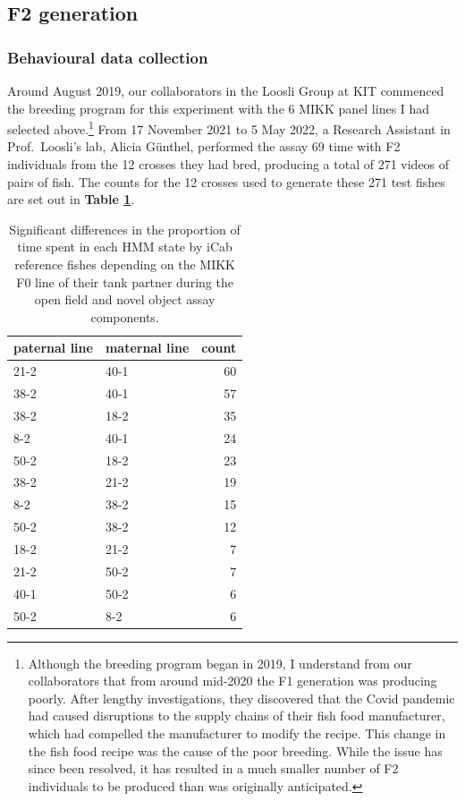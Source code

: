 \documentclass[
]{article}
\begin{document}
\hypertarget{f2-generation}{%
\subsection{F2 generation}\label{f2-generation}}

\hypertarget{behavioural-data-collection}{%
\subsubsection{Behavioural data collection}\label{behavioural-data-collection}}

Around August 2019, our collaborators in the Loosli Group at KIT commenced the breeding program for this experiment with the 6 MIKK panel lines I had selected above.\footnote{Although the breeding program began in 2019, I understand from our collaborators that from around mid-2020 the F1 generation was producing poorly. After lengthy investigations, they discovered that the Covid pandemic had caused disruptions to the supply chains of their fish food manufacturer, which had compelled the manufacturer to modify the recipe. This change in the fish food recipe was the cause of the poor breeding. While the issue has since been resolved, it has resulted in a much smaller number of F2 individuals to be produced than was originally anticipated.} From 17 November 2021 to 5 May 2022, a Research Assistant in Prof.~Loosli's lab, Alicia Günthel, performed the assay 69 time with F2 individuals from the 12 crosses they had bred, producing a total of 271 videos of pairs of fish. The counts for the 12 crosses used to generate these 271 test fishes are set out in \textbf{Table \ref{tab:F2-cross-counts}}.

\begin{table}

\caption{\label{tab:F2-cross-counts}Significant differences in the proportion of time spent in each HMM state by iCab reference fishes depending on the MIKK F0 line of their tank partner during the open field and novel object assay components.}
\centering
\begin{tabular}[t]{l|l|r}
\hline
paternal line & maternal line & count\\
\hline
21-2 & 40-1 & 60\\
\hline
38-2 & 40-1 & 57\\
\hline
38-2 & 18-2 & 35\\
\hline
8-2 & 40-1 & 24\\
\hline
50-2 & 18-2 & 23\\
\hline
38-2 & 21-2 & 19\\
\hline
8-2 & 38-2 & 15\\
\hline
50-2 & 38-2 & 12\\
\hline
18-2 & 21-2 & 7\\
\hline
21-2 & 50-2 & 7\\
\hline
40-1 & 50-2 & 6\\
\hline
50-2 & 8-2 & 6\\
\hline
\end{tabular}
\end{table}
\end{document}
